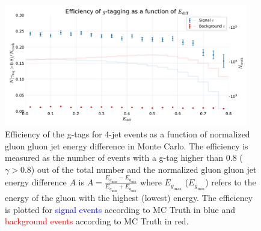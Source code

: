 \begin{figure}
  \centerfloat
  \includegraphics[width=0.95\textwidth, trim=0 0 0 40, clip, page=1]{figures/quarks/efficiency_events-down_sample=1.00-ML_vars=vertex-selection=b-ejet_min=4-n_iter_RS_lgb=99-n_iter_RS_xgb=9-cdot_cut=0.90-version=19-njet=4.pdf}
  \caption[g-Tagging efficiency for 4-jet events in MC as a function of normalized gluon gluon jet energy difference]
          {Efficiency of the g-tags for 4-jet events as a function of normalized gluon gluon jet energy difference in Monte Carlo. The efficiency is measured as the number of events with a g-tag higher than 0.8 ($\gamma > 0.8$) out of the total number and the normalized gluon gluon jet energy difference $A$ is $A=\frac{E_{g_\mathrm{max}}-E_{g_\mathrm{min}}}{E_{g_\mathrm{max}}+E_{g_\mathrm{min}}}$ where $E_{g_\mathrm{max}}$ ($E_{g_\mathrm{min}}$) refers to the energy of the gluon with the highest (lowest) energy. The efficiency is plotted for \textcolor{blue}{signal events} according to MC Truth in blue and \textcolor{red}{background events} according to MC Truth in red.
          } 
  \label{fig:q:effiency_gtag_E_diff}
\end{figure}


